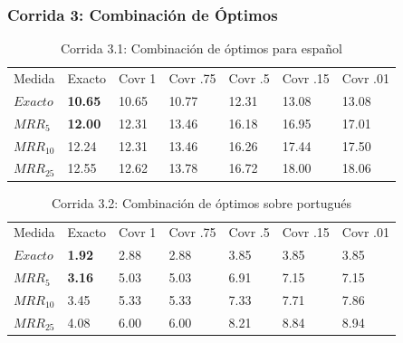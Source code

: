 \begin{frame}
\frametitle{Corrida 3: Combinación de Óptimos}


\begin{table}
\centering
\begin{center}
\begin{tabular}{|l | l | l | l | l | l | l |}

Medida & Exacto & Covr 1 & Covr .75 & Covr .5 & Covr .15 & Covr .01 \\ 
$Exacto$ & {\color{green}\textbf{10.65}} & 10.65 & 10.77 & 12.31 & 13.08 & 13.08  \\ 
$MRR_{5}$ & {\color{green}\textbf{12.00}} & 12.31 & 13.46 & 16.18 & 16.95 & 17.01  \\ 
$MRR_{10}$ & 12.24 & 12.31 & 13.46 & 16.26 & 17.44 & 17.50  \\ 
$MRR_{25}$ & 12.55 & 12.62 & 13.78 & 16.72 & 18.00 & 18.06  \\ 
\end{tabular}
\medskip
\caption{Corrida 3.1: Combinación de óptimos para español}
\label{table:optimos}
\end{center}
\end{table}

\begin{table}
\centering
\begin{center}
\begin{tabular}{|l | l | l | l | l | l | l |}

Medida & Exacto & Covr 1 & Covr .75 & Covr .5 & Covr .15 & Covr .01 \\ 
$Exacto$ & {\color{green}\textbf{1.92}} & 2.88 & 2.88 & 3.85 & 3.85 & 3.85  \\ 
$MRR_{5}$ & {\color{green}\textbf{3.16}} & 5.03 & 5.03 & 6.91 & 7.15 & 7.15  \\ 
$MRR_{10}$ & 3.45 & 5.33 & 5.33 & 7.33 & 7.71 & 7.86  \\ 
$MRR_{25}$ & 4.08 & 6.00 & 6.00 & 8.21 & 8.84 & 8.94  \\ 
\end{tabular}
\caption{Corrida 3.2: Combinación de óptimos sobre portugués}
\label{table:2_3_2_40_getExactMRRWikiFactoid_getCovrMRRWikiFactoid}
\end{center}
\end{table}

\end{frame}


